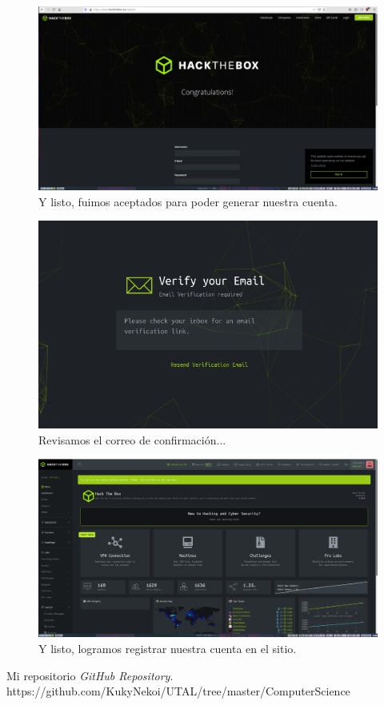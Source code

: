 \documentclass[11pt]{utalcaDoc}
\begin{document}
\begin{figure}[H]
	\centering
	\includegraphics[width=.9\textwidth]{images/09.png}
	\caption{ Y listo, fuimos aceptados para poder generar nuestra cuenta. }
\end{figure}

\begin{figure}[H]
	\centering
	\includegraphics[width=.9\textwidth]{images/10.png}
	\caption{ Revisamos el correo de confirmación... }
\end{figure}

\begin{figure}[H]
	\centering
	\includegraphics[width=.9\textwidth]{images/11.png}
	\caption{ Y listo, logramos registrar nuestra cuenta en el sitio. }
\end{figure}



\begin{thebibliography}{9}
	Mi repositorio
	\textit{GitHub Repository}.
	https://github.com/KukyNekoi/UTAL/tree/master/ComputerScience
\end{thebibliography}
\end{document}
